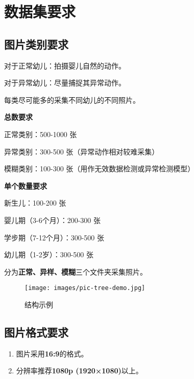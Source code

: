 \section{数据集要求}

\subsection{图片类别要求}

对于正常幼儿：拍摄婴儿自然的动作。

对于异常幼儿：尽量捕捉其异常动作。

每类尽可能多的采集不同幼儿的不同照片。

\textbf{总数要求}

正常类别：500-1000 张

异常类别：300-500 张（异常动作相对较难采集）

模糊类别：100-300 张（用作无效数据检测或异常检测模型）

\textbf{单个数量要求}

新生儿：100-200 张

婴儿期（3-6个月）：200-300 张

学步期（7-12个月）：300-500 张

幼儿期（1-2岁）：300-500 张

分为\textbf{正常、异样、模糊}三个文件夹采集照片。

\begin{figure}[H]
    \centering
    \texttt{[image: images/pic-tree-demo.jpg]}
    \caption{结构示例}
    \label{fig:file-tree}
\end{figure}

\subsection{图片格式要求}

\begin{enumerate}
    \item 图片采用\textbf{16:9}的格式。
    \item 分辨率推荐\textbf{1080p (1920×1080)}以上。
\end{enumerate}


